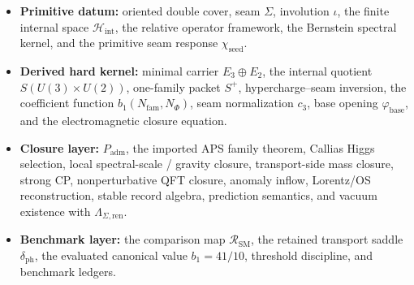 \documentclass[11pt,a4paper]{article}
\theoremstyle{definition}
\theoremstyle{remark}
\newcommand{\Seam}{\Sigma}
\newcommand{\inv}{\iota}
\newcommand{\cthree}{c_3}
\newcommand{\phibase}{\varphi_{\mathrm{base}}}
\newcommand{\bone}{b_1}
\newcommand{\SM}{\mathrm{SM}}
\newcommand{\Hint}{\mathcal H_{\mathrm{int}}}
\newcommand{\chiseed}{\chi_{\mathrm{seed}}}
\newcommand{\Padm}{P_{\mathrm{adm}}}
\begin{document}
\begin{tcolorbox}[colback=gray!4, colframe=gray!60, breakable,
    title={\textbf{Datum Hierarchy for the Present Draft}}, fonttitle=\bfseries]
\begin{itemize}[leftmargin=1.5em, topsep=3pt, itemsep=3pt]
    \item \textbf{Primitive datum:} oriented double cover, seam $\Seam$, involution $\inv$, the finite internal space $\Hint$, the relative operator framework, the Bernstein spectral kernel, and the primitive seam response $\chiseed$.
    \item \textbf{Derived hard kernel:} minimal carrier $E_3\oplus E_2$, the internal quotient $S(U(3)\times U(2))$, one-family packet $S^+$, hypercharge--seam inversion, the coefficient function $\bone(N_{\mathrm{fam}},N_\Phi)$, seam normalization $\cthree$, base opening $\phibase$, and the electromagnetic closure equation.
    \item \textbf{Closure layer:} $\Padm$, the imported APS family theorem, Callias Higgs selection, local spectral-scale / gravity closure, transport-side mass closure, strong CP, nonperturbative QFT closure, anomaly inflow, Lorentz/OS reconstruction, stable record algebra, prediction semantics, and vacuum existence with $\Lambda_{\Seam,\mathrm{ren}}$.
    \item \textbf{Benchmark layer:} the comparison map $\mathcal R_{\SM}$, the retained transport saddle $\delta_{\mathrm{ph}}$, the evaluated canonical value $\bone=41/10$, threshold discipline, and benchmark ledgers.
\end{itemize}
\end{tcolorbox}
\end{document}
